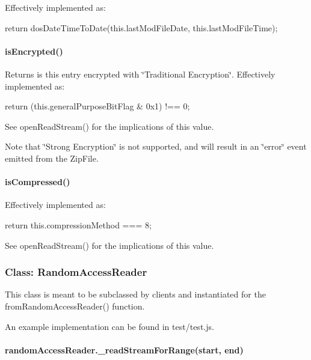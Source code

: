 Effectively implemented as\+:


\begin{DoxyCode}
return dosDateTimeToDate(this.lastModFileDate, this.lastModFileTime);
\end{DoxyCode}


\paragraph*{is\+Encrypted()}

Returns is this entry encrypted with \char`\"{}\+Traditional Encryption\char`\"{}. Effectively implemented as\+:


\begin{DoxyCode}
return (this.generalPurposeBitFlag & 0x1) !== 0;
\end{DoxyCode}


See {\ttfamily open\+Read\+Stream()} for the implications of this value.

Note that \char`\"{}\+Strong Encryption\char`\"{} is not supported, and will result in an {\ttfamily \char`\"{}error\char`\"{}} event emitted from the {\ttfamily Zip\+File}.

\paragraph*{is\+Compressed()}

Effectively implemented as\+:


\begin{DoxyCode}
return this.compressionMethod === 8;
\end{DoxyCode}


See {\ttfamily open\+Read\+Stream()} for the implications of this value.

\subsubsection*{Class\+: Random\+Access\+Reader}

This class is meant to be subclassed by clients and instantiated for the {\ttfamily from\+Random\+Access\+Reader()} function.

An example implementation can be found in {\ttfamily test/test.\+js}.

\paragraph*{random\+Access\+Reader.\+\_\+read\+Stream\+For\+Range(start, end)}

